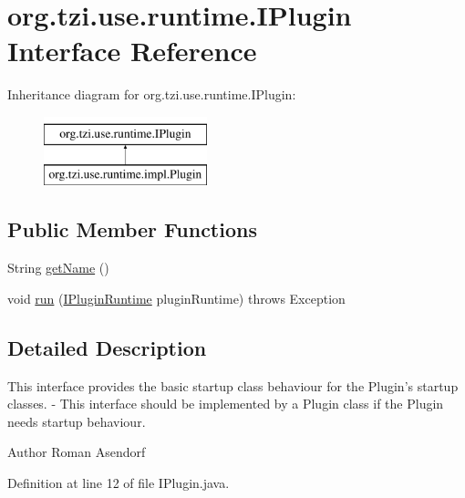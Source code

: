\hypertarget{interfaceorg_1_1tzi_1_1use_1_1runtime_1_1_i_plugin}{\section{org.\-tzi.\-use.\-runtime.\-I\-Plugin Interface Reference}
\label{interfaceorg_1_1tzi_1_1use_1_1runtime_1_1_i_plugin}
}
Inheritance diagram for org.\-tzi.\-use.\-runtime.\-I\-Plugin\-:\begin{figure}[H]
\begin{center}
\leavevmode
\includegraphics[height=2.000000cm]{interfaceorg_1_1tzi_1_1use_1_1runtime_1_1_i_plugin}
\end{center}
\end{figure}
\subsection*{Public Member Functions}
\begin{DoxyCompactItemize}
\item 
String \hyperlink{interfaceorg_1_1tzi_1_1use_1_1runtime_1_1_i_plugin_af374896f5eadf942155f9e91ccb49f15}{get\-Name} ()
\item 
void \hyperlink{interfaceorg_1_1tzi_1_1use_1_1runtime_1_1_i_plugin_a9bd5bbe75819b47469608a6fec4dc269}{run} (\hyperlink{interfaceorg_1_1tzi_1_1use_1_1runtime_1_1_i_plugin_runtime}{I\-Plugin\-Runtime} plugin\-Runtime)  throws Exception
\end{DoxyCompactItemize}


\subsection{Detailed Description}
This interface provides the basic startup class behaviour for the Plugin's startup classes. -\/ This interface should be implemented by a Plugin class if the Plugin needs startup behaviour.

\begin{DoxyAuthor}{Author}
Roman Asendorf 
\end{DoxyAuthor}


Definition at line 12 of file I\-Plugin.\-java.



